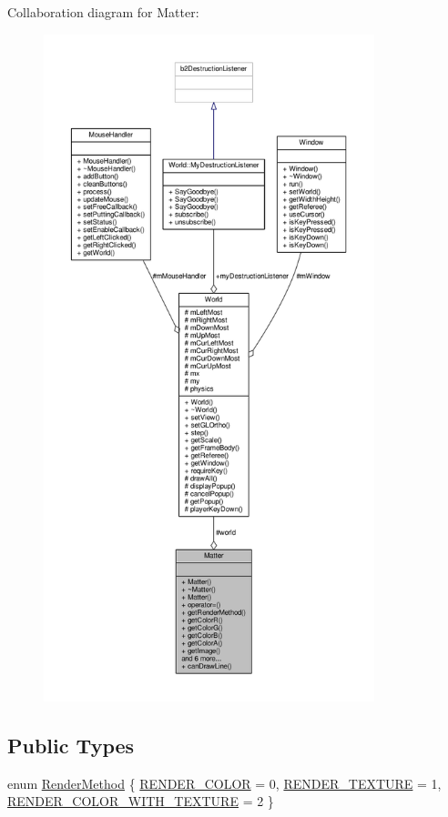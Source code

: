 Collaboration diagram for Matter\+:\nopagebreak
\begin{figure}[H]
\begin{center}
\leavevmode
\includegraphics[height=550pt]{classMatter__coll__graph}
\end{center}
\end{figure}
\subsection*{Public Types}
\begin{DoxyCompactItemize}
\item 
enum \hyperlink{classMatter_ade1ce1bf81f25377f689d103cd431907}{Render\+Method} \{ \hyperlink{classMatter_ade1ce1bf81f25377f689d103cd431907ad7201b31cb7302539e30e60b05464bae}{R\+E\+N\+D\+E\+R\+\_\+\+C\+O\+L\+O\+R} = 0, 
\hyperlink{classMatter_ade1ce1bf81f25377f689d103cd431907a0a15cf1b6cb2aa933e52d880a175c932}{R\+E\+N\+D\+E\+R\+\_\+\+T\+E\+X\+T\+U\+R\+E} = 1, 
\hyperlink{classMatter_ade1ce1bf81f25377f689d103cd431907ae26bb08225540fe1771201e859e04021}{R\+E\+N\+D\+E\+R\+\_\+\+C\+O\+L\+O\+R\+\_\+\+W\+I\+T\+H\+\_\+\+T\+E\+X\+T\+U\+R\+E} = 2
 \}
\end{DoxyCompactItemize}
